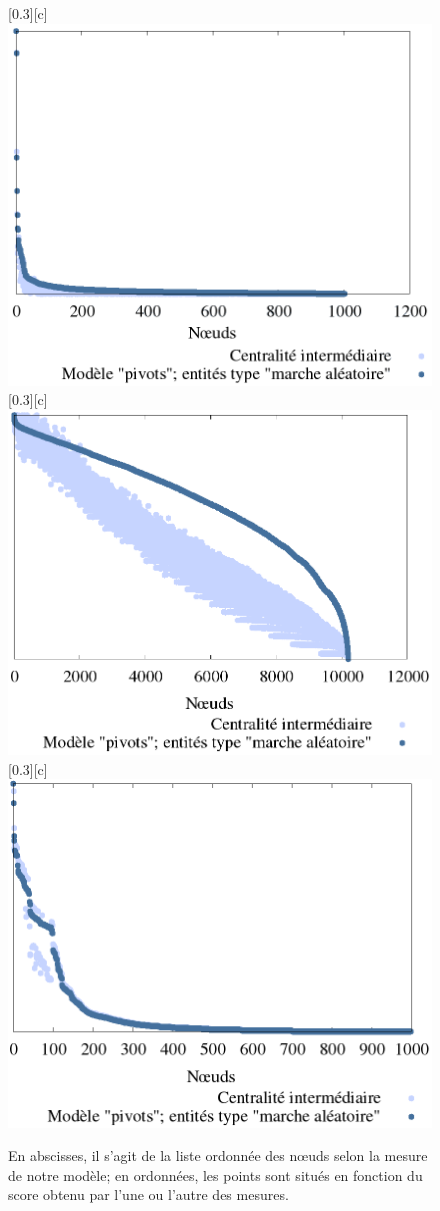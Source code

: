 \documentclass{beamer}
\begin{document}
\begin{frame}
    \begin{figure}[htbp]
		\centering
		[0.3\linewidth][c]{
			\includegraphics[width=0.3\linewidth]{./img/pivots_marche_aleatoire_dorogovstev_mendes.png}
		}
		\hfill
		[0.3\linewidth][c]{
			\includegraphics[width=0.3\linewidth]{./img/pivots_marche_aleatoire_grille_10000.png}
		}
		\hfill
		[0.3\linewidth][c]{
			\includegraphics[width=0.3\linewidth]{./img/pivots_marche_aleatoire_small_world_1000_2_0_5.png}
		}
		\caption{En abscisses, il s'agit de la liste ordonnée des n\oe uds selon la mesure de notre modèle; en ordonnées, les points sont situés en fonction du score obtenu par l'une ou l'autre des mesures.}
		\label{fig:graphiques_pivots_random_walk_1}
	\end{figure}
\end{frame}
\end{document}
